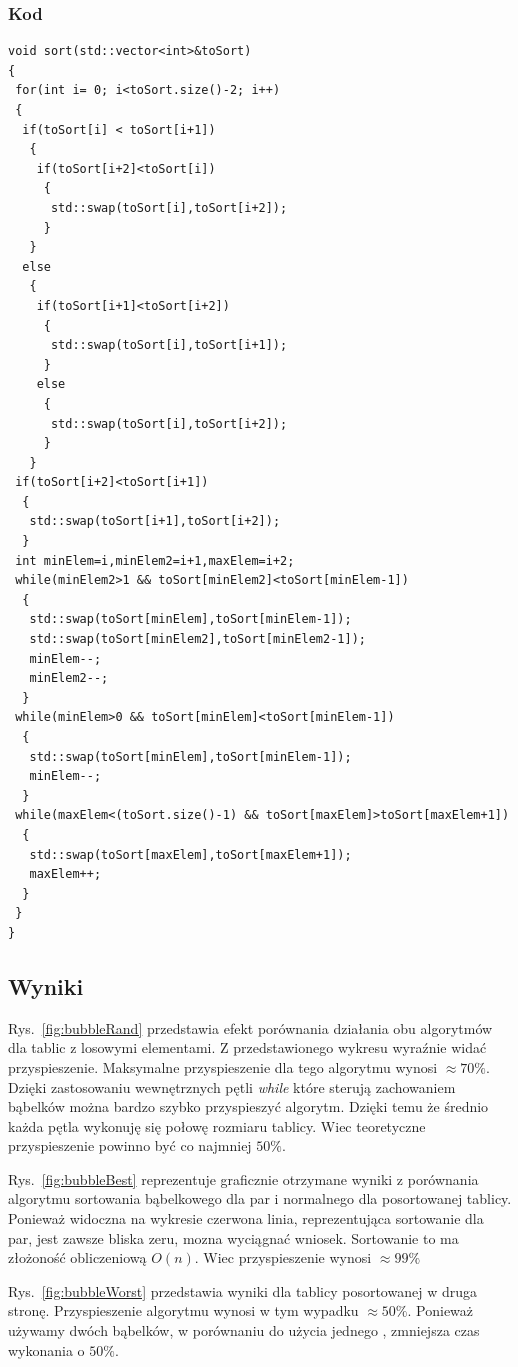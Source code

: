 \subsubsection{Kod}
\begin{lstlisting}[caption={Sortowanie bąbelkowe dla trzech elementow},label={lst:babelek}]
void sort(std::vector<int>&toSort)
{
 for(int i= 0; i<toSort.size()-2; i++)
 {
  if(toSort[i] < toSort[i+1])
   {
    if(toSort[i+2]<toSort[i])
     {
      std::swap(toSort[i],toSort[i+2]);
     }
   }
  else
   {
    if(toSort[i+1]<toSort[i+2])
     {
      std::swap(toSort[i],toSort[i+1]);
     }
    else
     {
      std::swap(toSort[i],toSort[i+2]);
     }
   }
 if(toSort[i+2]<toSort[i+1])
  {
   std::swap(toSort[i+1],toSort[i+2]);
  }
 int minElem=i,minElem2=i+1,maxElem=i+2;
 while(minElem2>1 && toSort[minElem2]<toSort[minElem-1])
  {
   std::swap(toSort[minElem],toSort[minElem-1]);
   std::swap(toSort[minElem2],toSort[minElem2-1]);
   minElem--;
   minElem2--;
  }
 while(minElem>0 && toSort[minElem]<toSort[minElem-1])
  {
   std::swap(toSort[minElem],toSort[minElem-1]);
   minElem--;
  }
 while(maxElem<(toSort.size()-1) && toSort[maxElem]>toSort[maxElem+1])
  {
   std::swap(toSort[maxElem],toSort[maxElem+1]);
   maxElem++;
  }
 }
}
\end{lstlisting}








\subsection{Wyniki}
\par Rys.~\ref{fig:bubbleRand} przedstawia efekt porównania działania obu algorytmów dla tablic z losowymi elementami. Z przedstawionego wykresu wyraźnie widać przyspieszenie. Maksymalne przyspieszenie dla tego algorytmu wynosi $\approx 70\%$. Dzięki zastosowaniu wewnętrznych pętli \textit{while} które sterują zachowaniem bąbelków można bardzo szybko przyspieszyć algorytm. Dzięki temu że średnio każda pętla wykonuję się połowę rozmiaru tablicy. Wiec teoretyczne przyspieszenie powinno być co najmniej $50 \% $.	
\par Rys.~\ref{fig:bubbleBest} reprezentuje graficznie otrzymane wyniki z porównania algorytmu sortowania bąbelkowego dla par i normalnego dla posortowanej tablicy. Ponieważ widoczna na wykresie czerwona linia, reprezentująca sortowanie dla par, jest zawsze bliska zeru, mozna wyciągnać wniosek. Sortowanie to ma złożoność obliczeniową $O(n)$. Wiec przyspieszenie wynosi $\approx 99\%$
\par Rys.~\ref{fig:bubbleWorst} przedstawia wyniki dla tablicy posortowanej w druga stronę. Przyspieszenie algorytmu wynosi w tym wypadku $\approx 50\%$. Ponieważ używamy dwóch bąbelków, w porównaniu do użycia jednego , zmniejsza czas wykonania o $50\%$.


